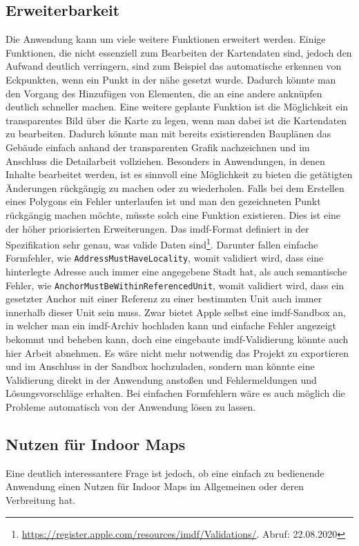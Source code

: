 \subsection{Erweiterbarkeit}
Die Anwendung kann um viele weitere Funktionen erweitert werden.
Einige Funktionen, die nicht essenziell zum Bearbeiten der Kartendaten sind, jedoch den Aufwand deutlich verringern, sind zum Beispiel das automatische erkennen von Eckpunkten, wenn ein Punkt in der nähe gesetzt wurde.
Dadurch könnte man den Vorgang des Hinzufügen von Elementen, die an eine andere anknüpfen deutlich schneller machen.\pbreak
%
Eine weitere geplante Funktion ist die Möglichkeit ein transparentes Bild über die Karte zu legen, wenn man dabei ist die Kartendaten zu bearbeiten.
Dadurch könnte man mit bereits existierenden Bauplänen das Gebäude einfach anhand der transparenten Grafik nachzeichnen und im Anschluss die Detailarbeit vollziehen.\pbreak%
%
Besonders in Anwendungen, in denen Inhalte bearbeitet werden, ist es sinnvoll eine Möglichkeit zu bieten die getätigten Änderungen rückgängig zu machen oder zu wiederholen.
Falls bei dem Erstellen eines Polygons ein Fehler unterlaufen ist und man den gezeichneten Punkt rückgängig machen möchte, müsste solch eine Funktion existieren.
Dies ist eine der höher priorisierten Erweiterungen.\pbreak%
%
Das \ac{imdf}-Format definiert in der Spezifikation sehr genau, was valide Daten sind\footnote{\url{https://register.apple.com/resources/imdf/Validations/}. Abruf: 22.08.2020}.
Darunter fallen einfache Formfehler, wie \texttt{AddressMustHaveLocality}, womit validiert wird, dass eine hinterlegte Adresse auch immer eine angegebene Stadt hat, als auch semantische Fehler, wie \texttt{AnchorMustBeWithinReferencedUnit}, womit validiert wird, dass ein gesetzter Anchor mit einer Referenz zu einer bestimmten Unit auch immer innerhalb dieser Unit sein muss.
Zwar bietet Apple selbst eine \ac{imdf}-Sandbox an, in welcher man ein \ac{imdf}-Archiv hochladen kann und einfache Fehler angezeigt bekommt und beheben kann, doch eine eingebaute \ac{imdf}-Validierung könnte auch hier Arbeit abnehmen.
Es wäre nicht mehr notwendig das Projekt zu exportieren und im Anschluss in der Sandbox hochzuladen, sondern man könnte eine Validierung direkt in der Anwendung anstoßen und Fehlermeldungen und Lösungsvorschläge erhalten.
Bei einfachen Formfehlern wäre es auch möglich die Probleme automatisch von der Anwendung lösen zu lassen.

\subsection{Nutzen für Indoor Maps}
Eine deutlich interessantere Frage ist jedoch, ob eine einfach zu bedienende Anwendung einen Nutzen für Indoor Maps im Allgemeinen oder deren Verbreitung hat.
